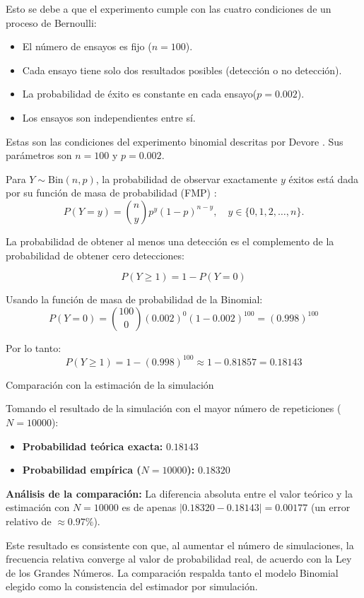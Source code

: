 \documentclass[11pt,a4paper]{article}
\begin{document}
Esto se debe a que el experimento cumple con las cuatro condiciones de un proceso de Bernoulli:

\begin{itemize}
    \item El número de ensayos es fijo ($n=100$).
    \item Cada ensayo tiene solo dos resultados posibles (detección o no detección).
    \item La probabilidad de éxito es constante en cada ensayo($p=0.002$).
    \item Los ensayos son independientes entre sí.
\end{itemize}

Estas son las condiciones del experimento binomial descritas por Devore \citep[sec.~3.4, p.~108]{devore2008}. Sus parámetros son $n=100$ y $p=0.002$.

Para $Y\sim\text{Bin}(n,p)$, la probabilidad de observar exactamente $y$ éxitos está dada por su función de masa de probabilidad (FMP) \citep[pp.~110--111]{devore2008}:
\[
    P(Y=y)=\binom{n}{y}p^y(1-p)^{n-y},
    \quad y\in\{0,1,2,\dots,n\}.
\]

La probabilidad de obtener al menos una detección es el complemento de la probabilidad de obtener cero detecciones:

\[
P(Y \geq 1) = 1 - P(Y = 0)
\]

Usando la función de masa de probabilidad de la Binomial:
\[
P(Y = 0) = \binom{100}{0} (0.002)^0 (1 - 0.002)^{100} = (0.998)^{100}
\]

Por lo tanto:
\[
P(Y \geq 1) = 1 - (0.998)^{100} \approx 1 - 0.81857 = 0.18143
\]

Comparación con la estimación de la simulación

Tomando el resultado de la simulación con el mayor número de repeticiones ($N = 10000$):

\begin{itemize}
    \item \textbf{Probabilidad teórica exacta:} $0.18143$
    \item \textbf{Probabilidad empírica ($N=10000$):} $0.18320$
\end{itemize}

\textbf{Análisis de la comparación:}
La diferencia absoluta entre el valor teórico y la estimación con $N=10000$ es de apenas $|0.18320 - 0.18143| = 0.00177$ (un error relativo de $\approx0.97\%$).

Este resultado es consistente con que, al aumentar el número de simulaciones, la frecuencia relativa converge al valor de probabilidad real, de acuerdo con la Ley de los Grandes Números. La comparación respalda tanto el modelo Binomial elegido como la consistencia del estimador por simulación.
\end{document}
